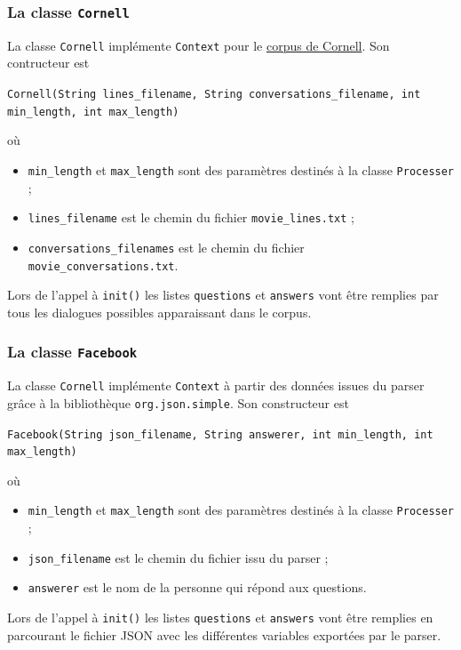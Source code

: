 \documentclass[10pt,a4paper]{article}
\newcommand\tab[1][0.5cm]{\hspace*{#1}}
\begin{document}
\subsubsection{La classe \texttt{Cornell}}
La classe \texttt{Cornell} implémente \texttt{Context} pour le \href{https://www.cs.cornell.edu/~cristian/Cornell_Movie-Dialogs_Corpus.html}{corpus de Cornell}. Son contructeur est
\begin{center}
 \texttt{Cornell(String lines\_filename, String conversations\_filename, int min\_length, int max\_length)}
\end{center}
où
\begin{itemize}
\item \texttt{min\_length} et \texttt{max\_length} sont des paramètres destinés à la classe \texttt{Processer} ;
\item \texttt{lines\_filename} est le chemin du fichier \texttt{movie\_lines.txt} ;
\item \texttt{conversations\_filenames} est le chemin du fichier \texttt{movie\_conversations.txt}.
\end{itemize}
\tab Lors de l'appel à \texttt{init()} les listes \texttt{questions} et \texttt{answers} vont être remplies par tous les dialogues possibles apparaissant dans le corpus.
\subsubsection{La classe \texttt{Facebook}}
La classe \texttt{Cornell} implémente \texttt{Context} à partir des données issues du parser grâce à la bibliothèque \texttt{org.json.simple}. Son constructeur est
\begin{center}
\texttt{Facebook(String json\_filename, String answerer, int min\_length, int max\_length)}
\end{center}
où
\begin{itemize}
\item \texttt{min\_length} et \texttt{max\_length} sont des paramètres destinés à la classe \texttt{Processer} ;
\item \texttt{json\_filename} est le chemin du fichier issu du parser ;
\item \texttt{answerer} est le nom de la personne qui répond aux questions.
\end{itemize}
\tab  Lors de l'appel à \texttt{init()} les listes \texttt{questions} et \texttt{answers} vont être remplies en parcourant le fichier JSON avec les différentes variables exportées par le parser.
\end{document}
